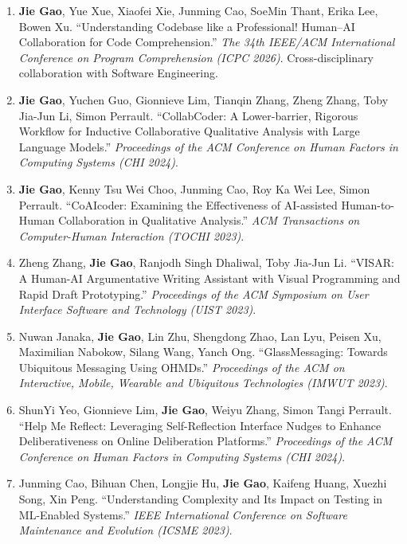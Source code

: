 \documentclass[11pt, letterpaper]{article}
\begin{document}
\begin{enumerate}[leftmargin=1.5em, itemsep=6pt]
\item \textbf{Jie Gao}, Yue Xue, Xiaofei Xie, Junming Cao, SoeMin Thant, Erika Lee, Bowen Xu. ``Understanding Codebase like a Professional! Human--AI Collaboration for Code Comprehension.'' \textit{The 34th IEEE/ACM International Conference on Program Comprehension (ICPC 2026)}. Cross-disciplinary collaboration with Software Engineering.

\item \textbf{Jie Gao}, Yuchen Guo, Gionnieve Lim, Tianqin Zhang, Zheng Zhang, Toby Jia-Jun Li, Simon Perrault. ``CollabCoder: A Lower-barrier, Rigorous Workflow for Inductive Collaborative Qualitative Analysis with Large Language Models.'' \textit{Proceedings of the ACM Conference on Human Factors in Computing Systems (CHI 2024)}.

\item \textbf{Jie Gao}, Kenny Tsu Wei Choo, Junming Cao, Roy Ka Wei Lee, Simon Perrault. ``CoAIcoder: Examining the Effectiveness of AI-assisted Human-to-Human Collaboration in Qualitative Analysis.'' \textit{ACM Transactions on Computer-Human Interaction (TOCHI 2023)}.

\item Zheng Zhang, \textbf{Jie Gao}, Ranjodh Singh Dhaliwal, Toby Jia-Jun Li. ``VISAR: A Human-AI Argumentative Writing Assistant with Visual Programming and Rapid Draft Prototyping.'' \textit{Proceedings of the ACM Symposium on User Interface Software and Technology (UIST 2023)}.

\item Nuwan Janaka, \textbf{Jie Gao}, Lin Zhu, Shengdong Zhao, Lan Lyu, Peisen Xu, Maximilian Nabokow, Silang Wang, Yanch Ong. ``GlassMessaging: Towards Ubiquitous Messaging Using OHMDs.'' \textit{Proceedings of the ACM on Interactive, Mobile, Wearable and Ubiquitous Technologies (IMWUT 2023)}.

\item ShunYi Yeo, Gionnieve Lim, \textbf{Jie Gao}, Weiyu Zhang, Simon Tangi Perrault. ``Help Me Reflect: Leveraging Self-Reflection Interface Nudges to Enhance Deliberativeness on Online Deliberation Platforms.'' \textit{Proceedings of the ACM Conference on Human Factors in Computing Systems (CHI 2024)}.

\item Junming Cao, Bihuan Chen, Longjie Hu, \textbf{Jie Gao}, Kaifeng Huang, Xuezhi Song, Xin Peng. ``Understanding Complexity and Its Impact on Testing in ML-Enabled Systems.'' \textit{IEEE International Conference on Software Maintenance and Evolution (ICSME 2023)}.
\end{enumerate}
\end{document}
